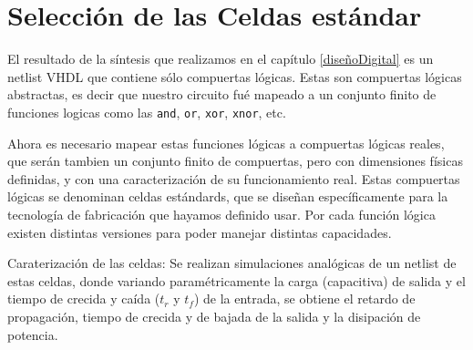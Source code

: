 





\section{Selección de las Celdas estándar}\label{celdasEstandars}
El resultado de la síntesis que realizamos en el capítulo \ref{diseñoDigital} es un netlist VHDL que contiene sólo compuertas lógicas. Estas son compuertas lógicas abstractas, es decir que nuestro circuito fué mapeado a un conjunto finito de funciones logicas como las \verb.and., \verb.or., \verb.xor., \verb.xnor., etc.

Ahora es necesario mapear estas funciones lógicas a compuertas lógicas reales, que serán tambien un conjunto finito de compuertas, pero con dimensiones físicas definidas, y con una caracterización de su funcionamiento real. Estas compuertas lógicas se denominan celdas estándards, que se diseñan específicamente para la tecnología de fabricación que hayamos definido usar. Por cada función lógica existen distintas versiones para poder manejar distintas capacidades. 

Caraterización de las celdas: Se realizan simulaciones analógicas de un netlist de estas celdas, donde variando paramétricamente la carga (capacitiva) de salida y el tiempo de crecida y caída ($t_r$ y $t_f$) de la entrada, se obtiene el retardo de propagación, tiempo de crecida y de bajada de la salida y la disipación de potencia.


